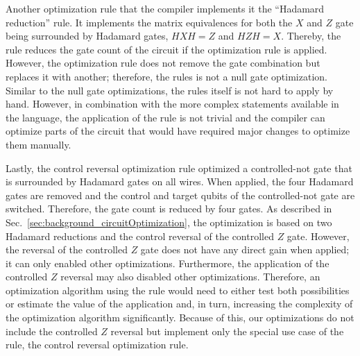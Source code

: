 Another optimization rule that the compiler implements it the ``Hadamard reduction'' rule. It implements the matrix equivalences for both the $X$ and $Z$ gate being surrounded by Hadamard gates, $HXH = Z$ and $HZH = X$. Thereby, the rule reduces the gate count of the circuit if the optimization rule is applied. However, the optimization rule does not remove the gate combination but replaces it with another; therefore, the rules is not a null gate optimization. 
Similar to the null gate optimizations, the rules itself is not hard to apply by hand. However, in combination with the more complex statements available in the language, the application of the rule is not trivial and the compiler can optimize parts of the circuit that would have required major changes to optimize them manually.

Lastly, the control reversal optimization rule optimized a controlled-not gate that is surrounded by Hadamard gates on all wires. When applied, the four Hadamard gates are removed and the control and target qubits of the controlled-not gate are switched. Therefore, the gate count is reduced by four gates. As described in Sec.~\ref{sec:background_circuitOptimization}, the optimization is based on two Hadamard reductions and the control reversal of the controlled $Z$ gate. However, the reversal of the controlled $Z$ gate does not have any direct gain when applied; it can only enabled other optimizations. Furthermore, the application of the controlled $Z$ reversal may also disabled other optimizations. Therefore, an optimization algorithm using the rule would need to either test both possibilities or estimate the value of the application and, in turn, increasing the complexity of the optimization algorithm significantly. Because of this, our optimizations do not include the controlled $Z$ reversal but implement only the special use case of the rule, the control reversal optimization rule.

